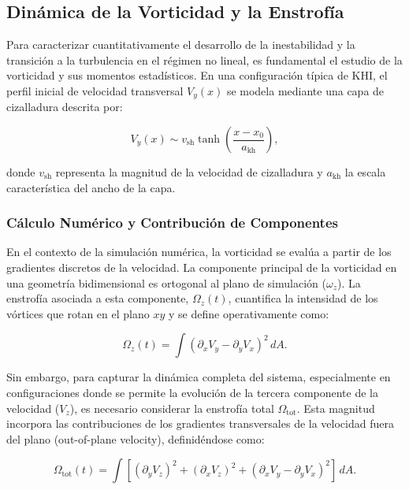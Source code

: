 \documentclass{article}
\begin{document}
\subsection{Dinámica de la Vorticidad y la Enstrofía}
Para caracterizar cuantitativamente el desarrollo de la inestabilidad y la transición a la turbulencia en el régimen no lineal, es fundamental el estudio de la vorticidad y sus momentos estadísticos. En una configuración típica de KHI, el perfil inicial de velocidad transversal $V_y(x)$ se modela mediante una capa de cizalladura descrita por:

\begin{equation}
    V_y(x) \sim v_{\text{sh}} \tanh\left(\frac{x - x_0}{a_{\text{kh}}}\right),
    \label{eq:vel_profile}
\end{equation}

\noindent donde $v_{\text{sh}}$ representa la magnitud de la velocidad de cizalladura y $a_{\text{kh}}$ la escala característica del ancho de la capa.

\subsubsection{Cálculo Numérico y Contribución de Componentes}
En el contexto de la simulación numérica, la vorticidad se evalúa a partir de los gradientes discretos de la velocidad. La componente principal de la vorticidad en una geometría bidimensional es ortogonal al plano de simulación ($\omega_z$). La enstrofía asociada a esta componente, $\Omega_z(t)$, cuantifica la intensidad de los vórtices que rotan en el plano $xy$ y se define operativamente como:

\begin{equation}
    \Omega_z(t) = \int (\partial_x V_y - \partial_y V_x)^2 \, dA.
\end{equation}

Sin embargo, para capturar la dinámica completa del sistema, especialmente en configuraciones donde se permite la evolución de la tercera componente de la velocidad ($V_z$), es necesario considerar la enstrofía total $\Omega_{\text{tot}}$. Esta magnitud incorpora las contribuciones de los gradientes transversales de la velocidad fuera del plano (out-of-plane velocity), definidéndose como:

\begin{equation}
    \Omega_{\text{tot}}(t) = \int \left[ (\partial_y V_z)^2 + (\partial_x V_z)^2 + (\partial_x V_y - \partial_y V_x)^2 \right] \, dA.
\end{equation}
\end{document}
